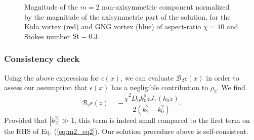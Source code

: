 \documentclass[apj]{emulateapj}
\newcommand{\Eq}[1]{Eq. (\ref{#1})}
\newcommand{\eq}[1]{\Eq{#1}}
\newcommand{\beq}{\begin{equation}}
\newcommand{\eeq}{\end{equation}}
\begin{document}
\begin{figure}
  \begin{center}
  \end{center}
  \caption[]{Magnitude of the $m=2$ non-axisymmetric component normalized by the magnitude of the axisymmetric part of the solution, for the Kida vortex (red) and GNG vortex (blue) of aspect-ratio $\chi=10$ and Stokes number $\rm{St}=0.3$. }
 \label{fig:nonaxi}
\end{figure}



\subsubsection{Consistency check}
Using the above expression for $\epsilon(x)$, we can evaluate
$\mathcal{B}_2\epsilon(x)$ in order to assess our assumption that
$\epsilon(x)$ has a negligible contribution to $\rho_2$. We find
\beq
\mathcal{B}_2\epsilon(z) =
-\frac{\tilde{\chi}^2D_0k_0^5zJ_1(k_0z)}{2\left(k_2^2 -
  k_0^2\right)}. 
\eeq
Provided that $|k_2^2|\gg1$, this term is indeed small compared to the
first term on the RHS of \eq{eq:m2_eq2}.
Our solution procedure above is self-consistent.  

\end{document}

